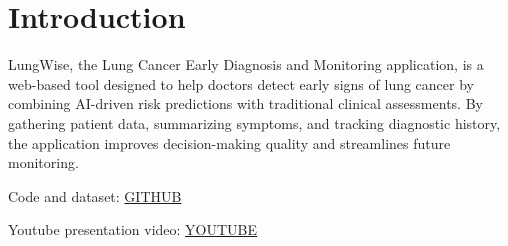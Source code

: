\section{Introduction}
LungWise, the Lung Cancer Early Diagnosis and Monitoring application, is a web-based tool designed to help doctors detect early signs of lung cancer by combining AI-driven risk predictions with traditional clinical assessments. By gathering patient data, summarizing symptoms, and tracking diagnostic history, the application improves decision-making quality and streamlines future monitoring.

Code and dataset: \href{https://github.com/anhdang000/lungwise-IntelligentSystem}{GITHUB}

Youtube presentation video: \href{https://youtu.be/m5jL2PAiXLk}{YOUTUBE}
